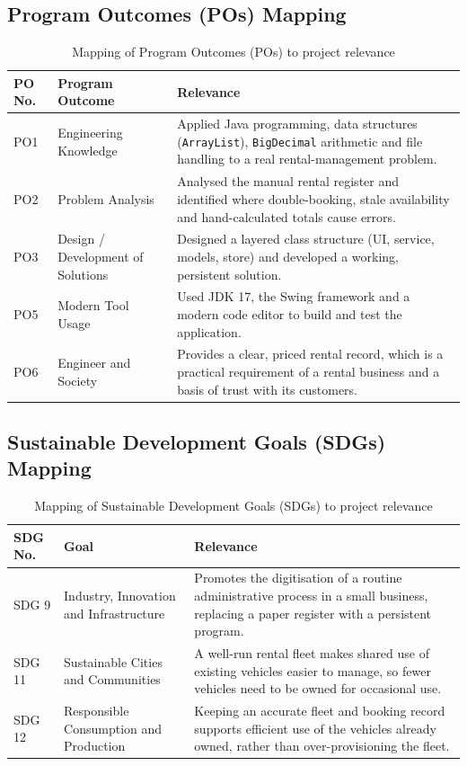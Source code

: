 \documentclass[11pt,a4paper]{article}
\begin{document}
\subsection{Program Outcomes (POs) Mapping}

\begin{table}[h]
\centering
\caption{Mapping of Program Outcomes (POs) to project relevance}
\begin{tabular}{p{1.2cm}p{4.2cm}p{8.6cm}}
\toprule
PO No. & Program Outcome & Relevance \\
\midrule
PO1 & Engineering Knowledge & Applied Java programming, data structures (\texttt{ArrayList}), \texttt{BigDecimal} arithmetic and file handling to a real rental-management problem. \\
PO2 & Problem Analysis & Analysed the manual rental register and identified where double-booking, stale availability and hand-calculated totals cause errors. \\
PO3 & Design / Development of Solutions & Designed a layered class structure (UI, service, models, store) and developed a working, persistent solution. \\
PO5 & Modern Tool Usage & Used JDK 17, the Swing framework and a modern code editor to build and test the application. \\
PO6 & Engineer and Society & Provides a clear, priced rental record, which is a practical requirement of a rental business and a basis of trust with its customers. \\
\bottomrule
\end{tabular}
\end{table}

\subsection{Sustainable Development Goals (SDGs) Mapping}

\begin{table}[h]
\centering
\caption{Mapping of Sustainable Development Goals (SDGs) to project relevance}
\begin{tabular}{p{1.4cm}p{4.2cm}p{8.4cm}}
\toprule
SDG No. & Goal & Relevance \\
\midrule
SDG 9 & Industry, Innovation and Infrastructure & Promotes the digitisation of a routine administrative process in a small business, replacing a paper register with a persistent program. \\
SDG 11 & Sustainable Cities and Communities & A well-run rental fleet makes shared use of existing vehicles easier to manage, so fewer vehicles need to be owned for occasional use. \\
SDG 12 & Responsible Consumption and Production & Keeping an accurate fleet and booking record supports efficient use of the vehicles already owned, rather than over-provisioning the fleet. \\
\bottomrule
\end{tabular}
\end{table}
\end{document}
